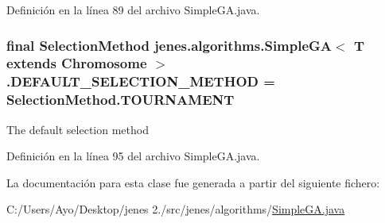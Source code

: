 Definición en la línea 89 del archivo Simple\-G\-A.\-java.

\hypertarget{classjenes_1_1algorithms_1_1_simple_g_a_3_01_t_01extends_01_chromosome_01_4_a93d44174d00fdf0a8ebedfa3badcde66}{
\subsubsection[{D\-E\-F\-A\-U\-L\-T\-\_\-\-S\-E\-L\-E\-C\-T\-I\-O\-N\-\_\-\-M\-E\-T\-H\-O\-D}]{\setlength{\rightskip}{0pt plus 5cm}final Selection\-Method jenes.\-algorithms.\-Simple\-G\-A$<$ T extends Chromosome $>$.D\-E\-F\-A\-U\-L\-T\-\_\-\-S\-E\-L\-E\-C\-T\-I\-O\-N\-\_\-\-M\-E\-T\-H\-O\-D = Selection\-Method.\-T\-O\-U\-R\-N\-A\-M\-E\-N\-T\hspace{0.3cm}{\ttfamily [static]}}}\label{classjenes_1_1algorithms_1_1_simple_g_a_3_01_t_01extends_01_chromosome_01_4_a93d44174d00fdf0a8ebedfa3badcde66}
The default selection method 

Definición en la línea 95 del archivo Simple\-G\-A.\-java.



La documentación para esta clase fue generada a partir del siguiente fichero\-:\begin{DoxyCompactItemize}
\item 
C\-:/\-Users/\-Ayo/\-Desktop/jenes 2./src/jenes/algorithms/\hyperlink{_simple_g_a_8java}{Simple\-G\-A.\-java}\end{DoxyCompactItemize}
